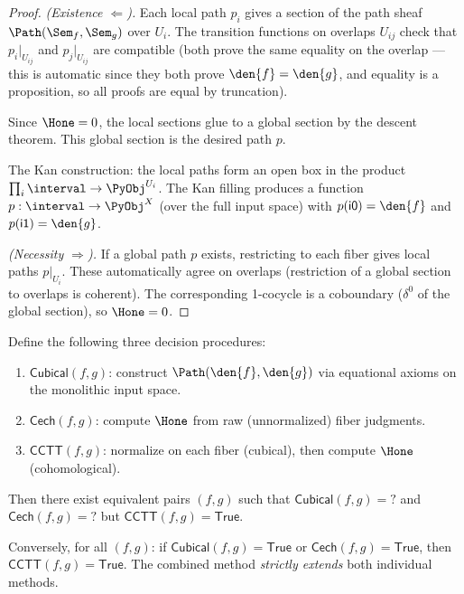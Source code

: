 \begin{proof}
\emph{(Existence $\Leftarrow$).}
Each local path $p_i$ gives a section of the path sheaf
$\Path(\Sem_f, \Sem_g)$ over $U_i$.  The transition functions on
overlaps $U_{ij}$ check that $p_i|_{U_{ij}}$ and $p_j|_{U_{ij}}$
are compatible (both prove the same equality on the overlap --- this
is automatic since they both prove $\den{f} = \den{g}$, and equality
is a proposition, so all proofs are equal by truncation).

Since $\Hone = 0$, the local sections glue to a global section by
the descent theorem.  This global section is the desired path $p$.

The Kan construction: the local paths form an open box in the product
$\prod_i \interval \to \PyObj^{U_i}$.  The Kan filling produces a
function $p : \interval \to \PyObj^X$ (over the full input space)
with $p(\mathsf{i0}) = \den{f}$ and $p(\mathsf{i1}) = \den{g}$.

\emph{(Necessity $\Rightarrow$).}
If a global path $p$ exists, restricting to each fiber gives local
paths $p|_{U_i}$.  These automatically agree on overlaps (restriction
of a global section to overlaps is coherent).  The corresponding
1-cocycle is a coboundary ($\delta^0$ of the global section), so
$\Hone = 0$.
\end{proof}

\begin{proposition}
\label{prop:gap}
Define the following three decision procedures:
\begin{enumerate}
  \item $\mathsf{Cubical}(f, g)$: construct $\Path(\den{f}, \den{g})$
    via equational axioms on the monolithic input space.
  \item $\mathsf{Cech}(f, g)$: compute $\Hone$ from raw (unnormalized)
    fiber judgments.
  \item $\mathsf{CCTT}(f, g)$: normalize on each fiber (cubical), then
    compute $\Hone$ (cohomological).
\end{enumerate}
Then there exist equivalent pairs $(f, g)$ such that
$\mathsf{Cubical}(f, g) = {?}$ and $\mathsf{Cech}(f, g) = {?}$
but $\mathsf{CCTT}(f, g) = \mathsf{True}$.

Conversely, for all $(f, g)$: if $\mathsf{Cubical}(f, g) =
\mathsf{True}$ or $\mathsf{Cech}(f, g) = \mathsf{True}$, then
$\mathsf{CCTT}(f, g) = \mathsf{True}$.  The combined method
\emph{strictly extends} both individual methods.
\end{proposition}


